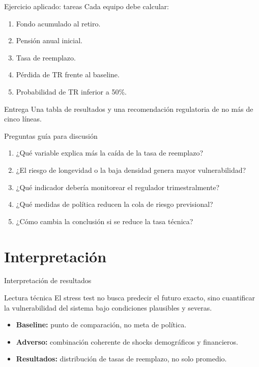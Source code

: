 \documentclass[aspectratio=169,11pt]{beamer}
\begin{document}
\begin{frame}{Ejercicio aplicado: tareas}
Cada equipo debe calcular:

\begin{enumerate}
  \item Fondo acumulado al retiro.
  \item Pensión anual inicial.
  \item Tasa de reemplazo.
  \item Pérdida de TR frente al baseline.
  \item Probabilidad de TR inferior a 50\%.
\end{enumerate}

\vspace{0.2cm}
\begin{alertblock}{Entrega}
Una tabla de resultados y una recomendación regulatoria de no más de cinco líneas.
\end{alertblock}
\end{frame}

\begin{frame}{Preguntas guía para discusión}
\begin{enumerate}
  \item ¿Qué variable explica más la caída de la tasa de reemplazo?
  \item ¿El riesgo de longevidad o la baja densidad genera mayor vulnerabilidad?
  \item ¿Qué indicador debería monitorear el regulador trimestralmente?
  \item ¿Qué medidas de política reducen la cola de riesgo previsional?
  \item ¿Cómo cambia la conclusión si se reduce la tasa técnica?
\end{enumerate}
\end{frame}

\section{Interpretación}

\begin{frame}{Interpretación de resultados}
\begin{block}{Lectura técnica}
El stress test no busca predecir el futuro exacto, sino cuantificar la vulnerabilidad del sistema bajo condiciones plausibles y severas.
\end{block}

\begin{itemize}
  \item \textbf{Baseline:} punto de comparación, no meta de política.
  \item \textbf{Adverso:} combinación coherente de shocks demográficos y financieros.
  \item \textbf{Resultados:} distribución de tasas de reemplazo, no solo promedio.
\end{itemize}
\end{frame}
\end{document}
